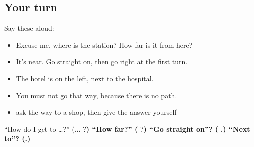 \subsection*{Your turn}
Say these aloud:

\begin{itemize}
\raggedright
  \item Excuse me, where is the station? How far is it from here?
  \item It's near. Go straight on, then go right at the first turn.
  \item The hotel is on the left, next to the hospital.
  \item You must not go that way, because there is no path.
  \item ask the way to a shop, then give the answer yourself
\end{itemize}

\begin{tcolorbox}[breakable,colback=teal!4,colframe=teal!35!black,title={Before you move on}]
\textquotedblleft{}How do I get to …?\textquotedblright{} (\textbf{… } ?\textbf{\emph{}) \textquotedblleft{}How far?\textquotedblright{} (} ?\textbf{) \textquotedblleft{}Go straight on\textquotedblright{}? (} \textbf{.) \textquotedblleft{}Next to\textquotedblright{}? (}\textbf{.)}
\end{tcolorbox}
